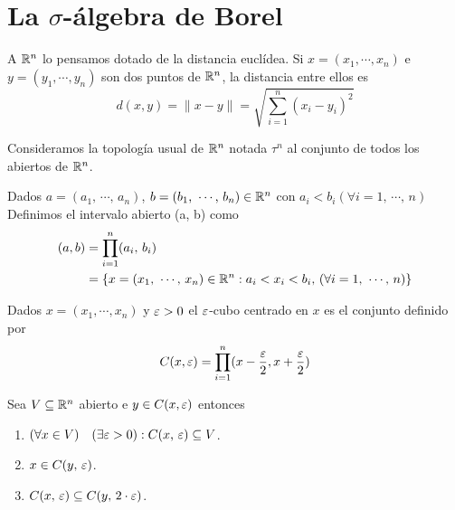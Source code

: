 \section{La $\sigma$-álgebra de Borel}
\label{sec:borel}

A $\mathbb{R}^n$ lo pensamos dotado de la distancia euclídea.
Si $x = (x_1, \cdots, x_n)$ e $y = (y_1, \cdots, y_n)$ son dos puntos de $\mathbb{R}^n$, la distancia
entre ellos es
\begin{equation*}
    d(x, y) = \|x-y\| = \sqrt{ \sum_{i=1}^n (x_i - y_i)^2 }
\end{equation*}

Consideramos la topología usual de $\mathbb{R}^n$ notada $\tau^n$ al conjunto de todos los abiertos de $\mathbb{R}^n$.

\begin{definition}
    Dados $a = (a_1\text{, } \cdots\text{, } a_n)$, $b = (b_1\text{, } \cdots\text{, } b_n) \in \mathbb{R}^n$ con $a_i < b_i (\forall i = 1 \text{, } \cdots \text{, } n)$
    Definimos el intervalo abierto (a, b) como
    \begin{align*}
        (a, b) & = \prod_{i=1}^n (a_i\text{, } b_i)                                                                                                \\
               & = \{ x = (x_1\text{, } \cdots \text{, } x_n) \in \mathbb{R}^n : a_i < x_i < b_i \text{, } (\forall i = 1 \text{, } \cdots \text{, } n) \}
    \end{align*}
\end{definition}

\begin{definition}[$\e$-cubo]
    Dados $x= (x_1, \cdots, x_n)$ y $\varepsilon > 0$ el $\e$-cubo centrado en $x$ es el conjunto definido por
    \begin{equation*}
        C(x, \varepsilon) = \prod_{i = 1}^n (x - \frac{\varepsilon}{2}, x + \frac{\varepsilon}{2})
    \end{equation*}
\end{definition}

\begin{prop}
    Sea $V \subseteq \mathbb{R}^n$ abierto e $y \in C(x, \varepsilon)$ entonces
    \begin{enumerate}
        \item $(\forall x \in V) \quad (\exists \varepsilon > 0) : C(x \text{, } \varepsilon) \subseteq V$.
        \item $x \in C(y\text{, } \varepsilon)$.
        \item $C(x\text{, } \varepsilon) \subseteq C(y\text{, } 2 \cdot \varepsilon)$.
    \end{enumerate}
\end{prop}

